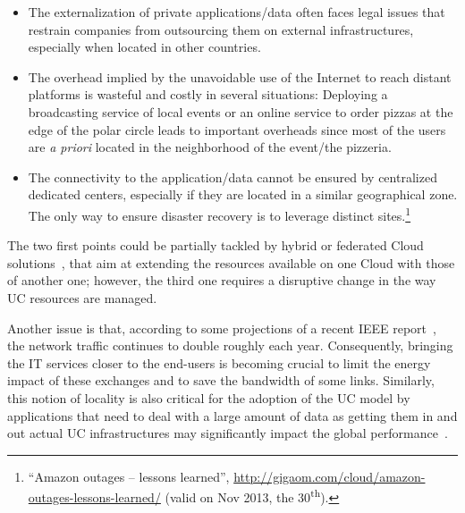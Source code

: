 \begin{itemize}
\item The externalization of private applications/data often faces legal issues
that restrain companies from outsourcing them on external infrastructures,
especially when located in other countries. 
\item The overhead implied by the unavoidable use of the Internet to reach
distant platforms is wasteful and costly in several situations: Deploying a
broadcasting service of local events or an online service to order pizzas at the
edge of the polar circle leads to important overheads since
most of the users are \emph{a priori} located in the neighborhood of the
event/the pizzeria.  
\item The connectivity to the application/data cannot be ensured by centralized
dedicated centers, especially if they are located in a similar geographical
zone. The only way to ensure disaster recovery is to leverage distinct
sites.\footnote{``Amazon outages – lessons learned'',
\href{http://gigaom.com/cloud/amazon-outages-lessons-learned/}{http://gigaom.com/cloud/amazon-outages-lessons-learned/}
(valid on  Nov 2013, the 30\textsuperscript{th}).} 
\end{itemize}

The two first points could be partially tackled by hybrid or federated Cloud
solutions~\cite{armbrust:2010}, that aim at extending
the resources available on one Cloud with those of another one; however, the third 
one requires a disruptive change in
the way UC resources are managed.

Another issue is that, according to some projections of a recent IEEE
report~\cite{ieeenetreport:2012}, the network traffic continues to double roughly each
year. Consequently, bringing the IT services closer to the end-users is becoming crucial to limit
the energy impact of these exchanges and to save the bandwidth of some links. Similarly,
this notion of locality is also critical for the adoption of the UC model by applications
that need to deal with a large amount of data as getting them in and out actual UC
infrastructures may significantly impact the global performance~\cite{Fos11}. 

